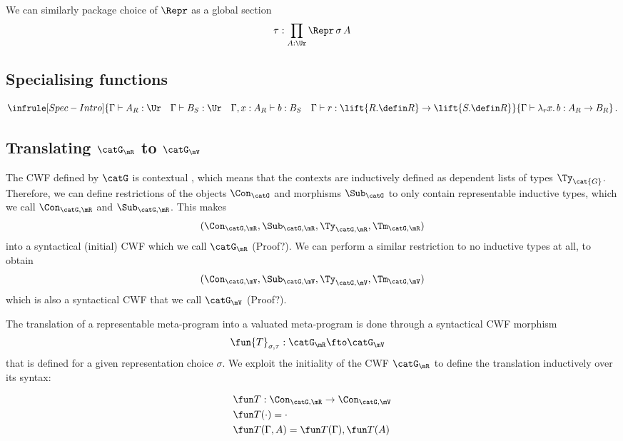 
We can similarly package choice of $\Repr$ as a global section
\[
  \tau : \prod_{A : \Ur} \Repr \, \sigma \, A
\]

\subsection{Specialising functions}

\[
  \infrule[Spec-Intro]{\Gamma \vdash A_R : \Ur \quad \Gamma \vdash B_S : \Ur \quad \Gamma, x : A_R \vdash b : B_S \quad \Gamma \vdash r : \lift{R.\defin R} \to \lift{S.\defin R}}
  {\Gamma \vdash \lambda_r x . \, b : A_R \to B_R} \,.
\]

\subsection{Translating $\catG_\mR$ to $\catG_\mV$}

The CWF defined by $\catG$ is contextual \cite{Castellan2019-sh}, which means
that the contexts are inductively defined as dependent lists of types
$\Ty_\cat{G}$. Therefore, we can define restrictions of the objects
$\Con_{\catG}$ and morphisms $\Sub_{\catG}$ to only contain representable
inductive types, which we call $\Con_{\catG,\mR}$ and $\Sub_{\catG,\mR}$. This
makes
\[
  (\Con_{\catG, \mR}, \Sub_{\catG, \mR}, \Ty_{\catG, \mR}, \Tm_{\catG, \mR})
\]
into a syntactical (initial) CWF which we call $\catG_\mR$ (Proof?). We can
perform a similar restriction to no inductive types at all, to obtain
\[
  (\Con_{\catG, \mV}, \Sub_{\catG, \mV}, \Ty_{\catG, \mV}, \Tm_{\catG, \mV})
\]
which is also a syntactical CWF that we call $\catG_\mV$ (Proof?).

The translation of a representable meta-program into a valuated meta-program is
done through a syntactical CWF morphism
\begin{align*}
  \fun{T}_{\sigma, \tau} : \catG_\mR & \fto \catG_\mV
\end{align*}
that is defined for a given representation choice $\sigma$.
We exploit the initiality of the CWF $\catG_\mR$ to define the translation
inductively over its syntax:

\begin{align*}
   & \fun T            : \Con_{\catG, \mR} \to \Con_{\catG, \mV} \\
   & \fun T(\cdot)     = \cdot                                   \\
   & \fun T(\Gamma, A) = \fun T(\Gamma), \fun T(A)
\end{align*}

